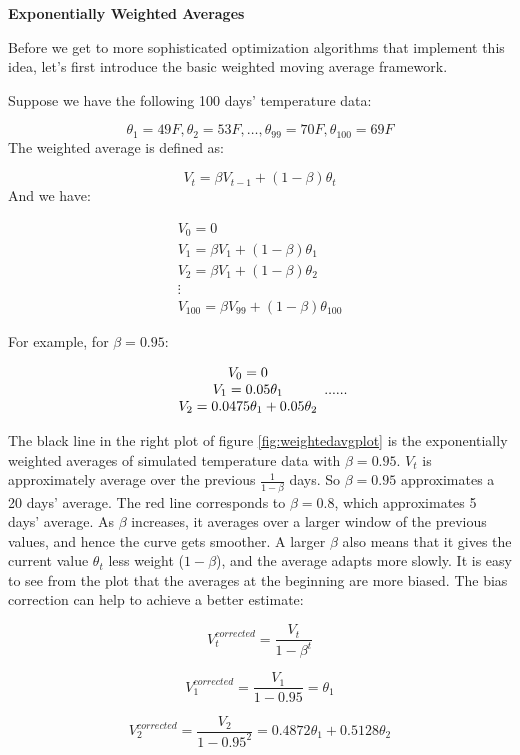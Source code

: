 \documentclass[12pt,]{krantz}
\begin{document}
\textbf{Exponentially Weighted Averages}

Before we get to more sophisticated optimization algorithms that implement this idea, let's first introduce the basic weighted moving average framework.

Suppose we have the following 100 days' temperature data:

\[ \theta_{1}=49F, \theta_{2}=53F, \dots, \theta_{99}=70F, \theta_{100}=69F\]
The weighted average is defined as:

\[V_t = \beta V_{t-1}+(1-\beta)\theta_t\]
And we have:

\[
\begin{array}{c} V_{0}=0\\ V_{1}=\beta V_1 + (1-\beta)\theta_1\\ V_2=\beta V_1 + (1-\beta)\theta_2\\ \vdots \\ V_{100}= \beta V_{99} + (1-\beta)\theta_{100} \end{array}\]

For example, for \(\beta=0.95\):

\[\begin{array}{c} V_{0}=0 \\ V_{1}=0.05\theta_{1}  \\ V_{2}=0.0475\theta_{1}+0.05\theta_{2}   \end{array} \\ ......\]

The black line in the right plot of figure \ref{fig:weightedavgplot} is the exponentially weighted averages of simulated temperature data with \(\beta = 0.95\). \(V_t\) is approximately average over the previous \(\frac{1}{1-\beta}\) days. So \(\beta = 0.95\) approximates a 20 days' average. The red line corresponds to \(\beta = 0.8\), which approximates 5 days' average. As \(\beta\) increases, it averages over a larger window of the previous values, and hence the curve gets smoother. A larger \(\beta\) also means that it gives the current value \(\theta_t\) less weight (\(1-\beta\)), and the average adapts more slowly. It is easy to see from the plot that the averages at the beginning are more biased. The bias correction can help to achieve a better estimate:

\[V_t^{corrected} = \frac{V_t}{1-\beta^t}\]

\[V_{1}^{corrected}=\frac{V_{1}}{1-0.95}=\theta_{1}\]

\[V_{2}^{corrected}=\frac{V_{2}}{1-0.95^{2}}=0.4872\theta_{1}+0.5128\theta_{2}\]
\end{document}
